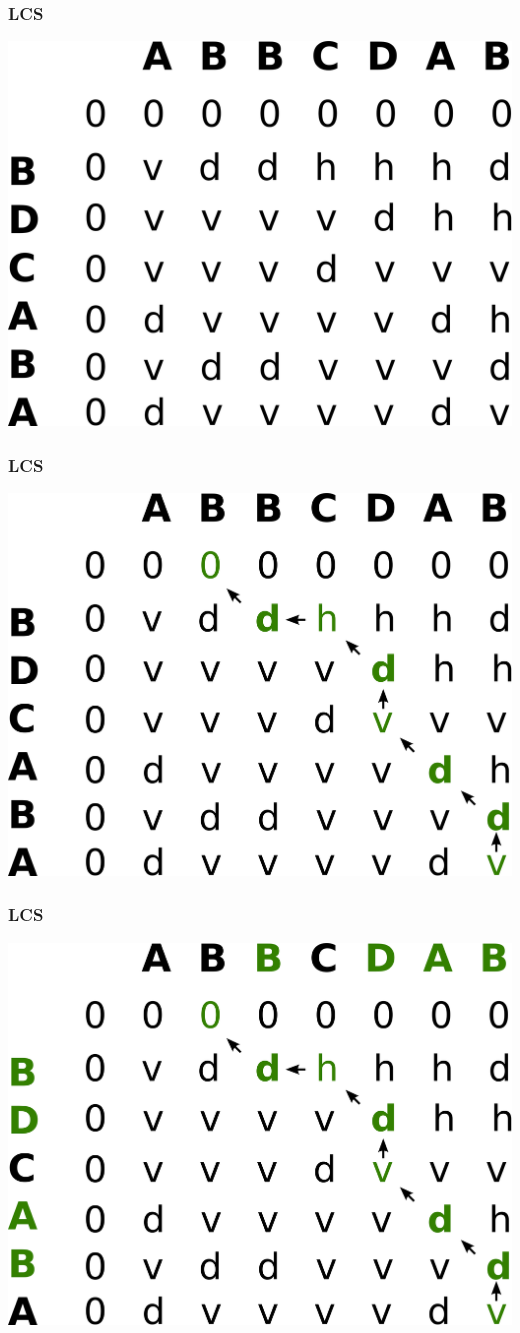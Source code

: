 \documentclass[12pt,pdf,hyperref={unicode}]{beamer}
\begin{document}
\begin{frame}[fragile]
\frametitle{LCS} 
\begin{center}
\includegraphics[width=0.75\linewidth]{images/lcstable9.png}
\end{center}
\end{frame}

\begin{frame}[fragile]
\frametitle{LCS} 
\begin{center}
\includegraphics[width=0.75\linewidth]{images/lcstable10.png}
\end{center}
\end{frame}

\begin{frame}[fragile]
\frametitle{LCS} 
\begin{center}
\includegraphics[width=0.75\linewidth]{images/lcstable11.png}
\end{center}
\end{frame}
\end{document}
